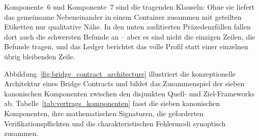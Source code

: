 \documentclass[11pt,a4paper]{article}
\begin{document}
Komponente~6 und Komponente~7 sind die tragenden Klauseln: Ohne sie liefert das
gemeinsame Nebeneinander in einem Container zusammen mit geteilten Etiketten
nur qualitative Nähe. In den unten auditierten Präzedenzfällen fallen dort
auch die schwersten Befunde an -- aber es sind nicht die einzigen Zeilen,
die Befunde tragen, und das Ledger berichtet das volle Profil statt einer
einzelnen übrig bleibenden Zeile.

Abbildung~\ref{fig:bridge_contract_architecture} illustriert die konzeptionelle Architektur eines Bridge Contracts und bildet das Zusammenspiel der sieben kanonischen Komponenten zwischen den disjunkten Quell- und Ziel-Frameworks ab. Tabelle~\ref{tab:vertrags_komponenten} fasst die sieben kanonischen Komponenten, ihre mathematischen Signaturen, die geforderten Verifikationspflichten und die charakteristischen Fehlermodi synoptisch zusammen.
\end{document}

